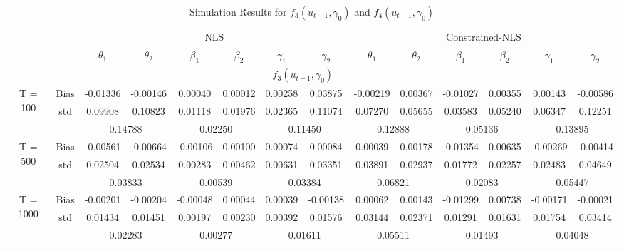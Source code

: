 \documentclass[a4paper,12pt,times,numbered,print,index]{report}
\numberwithin{equation}{section}
\begin{document}
\begin{table}[htbp]
  \centering
  \caption{Simulation Results for $f_3 (u_{t-1}, \gamma_0)$ and $f_4 (u_{t-1}, \gamma_0)$}
    \begin{adjustbox}{max width=\textwidth}
    \begin{tabular}{cccccccccccccc}
    \toprule
          &       & \multicolumn{6}{c}{NLS}                       & \multicolumn{6}{c}{Constrained-NLS} \\
          &       & $\theta_1$ & $\theta_2$ & $\beta_1$ & $\beta_2$ & $\gamma_1$ & $\gamma_2$ & $\theta_1$ & $\theta_2$ & $\beta_1$ & $\beta_2$ & $\gamma_1$ & $\gamma_2$ \\
    \midrule
    &       & \multicolumn{10}{c}{$f_3 (u_{t-1}, \gamma_0)$}                \\
    \midrule
    \multirow{3}[1]{*}{T = 100} & Bias  & -0.01336 & -0.00146 & 0.00040 & 0.00012 & 0.00258 & 0.03875 & -0.00219 & 0.00367 & -0.01027 & 0.00355 & 0.00143 & -0.00586 \\
          & std   & 0.09908 & 0.10823 & 0.01118 & 0.01976 & 0.02365 & 0.11074 & 0.07270 & 0.05655 & 0.03583 & 0.05240 & 0.06347 & 0.12251 \\
          &       & \multicolumn{2}{c}{0.14788} & \multicolumn{2}{c}{0.02250} & \multicolumn{2}{c}{0.11450} & \multicolumn{2}{c}{0.12888} & \multicolumn{2}{c}{0.05136} & \multicolumn{2}{c}{0.13895} \\
    \multirow{3}[0]{*}{T = 500} & Bias  & -0.00561 & -0.00664 & -0.00106 & 0.00100 & 0.00074 & 0.00084 & 0.00039 & 0.00178 & -0.01354 & 0.00635 & -0.00269 & -0.00414 \\
          & std   & 0.02504 & 0.02534 & 0.00283 & 0.00462 & 0.00631 & 0.03351 & 0.03891 & 0.02937 & 0.01772 & 0.02257 & 0.02483 & 0.04649 \\
          &       & \multicolumn{2}{c}{0.03833} & \multicolumn{2}{c}{0.00539} & \multicolumn{2}{c}{0.03384} & \multicolumn{2}{c}{0.06821} & \multicolumn{2}{c}{0.02083} & \multicolumn{2}{c}{0.05447} \\
    \multirow{3}[1]{*}{T = 1000} & Bias  & -0.00201 & -0.00204 & -0.00048 & 0.00044 & 0.00039 & -0.00138 & 0.00062 & 0.00143 & -0.01299 & 0.00738 & -0.00171 & -0.00021 \\
          & std   & 0.01434 & 0.01451 & 0.00197 & 0.00230 & 0.00392 & 0.01576 & 0.03144 & 0.02371 & 0.01291 & 0.01631 & 0.01754 & 0.03414 \\
          &       & \multicolumn{2}{c}{0.02283} & \multicolumn{2}{c}{0.00277} & \multicolumn{2}{c}{0.01611} & \multicolumn{2}{c}{0.05511} & \multicolumn{2}{c}{0.01493} & \multicolumn{2}{c}{0.04048} \\

\end{tabular}
\end{adjustbox}
\end{table}
\end{document}
